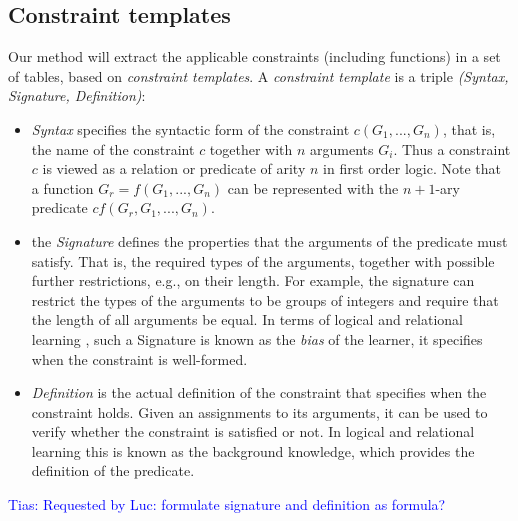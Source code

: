 \documentclass{sig-alternate-05-2015}
\newcommand{\tias}[1]{\textcolor{blue}{{\sc Tias:} #1}\xspace}
\newcommand{\format}[1]{\textit{#1}\xspace}
\newcommand{\template}{\format{constraint template}}
\newcommand{\CName}{Syntax\xspace}
\newcommand{\CSignature}{Signature\xspace}
\newcommand{\CFunction}{Definition\xspace}
\begin{document}
\subsection{Constraint templates}
Our method will extract the applicable constraints (including functions) in a set of tables, based on \textit{constraint templates}.
%
A \template is a triple \textit{(\CName, \CSignature, \CFunction)}:
\begin{itemize}
\item
\textit{\CName}  specifies the syntactic form of the constraint $c(G_1, ...,G_n)$, that is, the name of the constraint $c$ together
with $n$ arguments $G_i$. Thus a constraint $c$ is viewed as a relation or predicate of arity $n$ in first order logic. Note that a function $G_r=f(G_1,...,G_n)$ can be represented with the $n+1$-ary predicate $cf(G_r,G_1,...,G_n)$.

\item the \textit{\CSignature} defines the properties that the arguments of the predicate must satisfy. That is, the required types of the arguments, together
with possible further restrictions, e.g., on their length. For example, the signature can restrict the types of the arguments to be groups of integers and require that the length of all arguments be equal. In terms of logical and relational learning \cite{luc_book}, such a \CSignature is known as the {\em bias} of the learner, it specifies when the constraint is well-formed.

\item \textit{\CFunction} is the actual definition of the constraint that specifies when the constraint holds. Given an assignments to its arguments, it can be used to verify whether the constraint is satisfied or not. %
In logical and relational learning this is known as the background knowledge, which provides the definition of the predicate.
\end{itemize}
\tias{Requested by Luc: formulate signature and definition as formula?}
\end{document}
